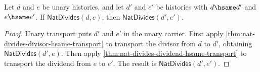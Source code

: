 \begin{corollary}
\label{cor:nat-divides-endpoint-hsame-transport}
Let $d$ and $e$ be unary histories, and let $d'$ and $e'$ be histories with $d\hsame d'$ and $e\hsame e'$. If $\mathsf{NatDivides}(d,e)$, then $\mathsf{NatDivides}(d',e')$.
\end{corollary}
\begin{proof}
Unary transport puts $d'$ and $e'$ in the unary carrier. First apply \autoref{thm:nat-divides-divisor-hsame-transport} to transport the divisor from $d$ to $d'$, obtaining $\mathsf{NatDivides}(d',e)$. Then apply \autoref{thm:nat-divides-dividend-hsame-transport} to transport the dividend from $e$ to $e'$. The result is $\mathsf{NatDivides}(d',e')$.
\end{proof}

